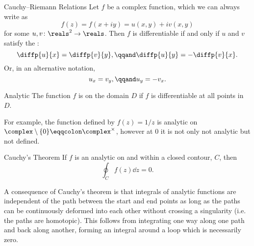 \documentclass[fleqn]{NotesClass}
\begin{document}
    \begin{thm}{Cauchy--Riemann Relations}{}
        Let \(f\) be a complex function, which we can always write as
        \begin{equation}
            f(z) = f(x + iy) = u(x, y) + iv(x, y)
        \end{equation}
        for some \(u, v\colon \reals^2 \to \reals\).
        Then \(f\) is differentiable if and only if \(u\) and \(v\) satisfy the :
        \begin{equation}
            \diffp{u}{x} = \diffp{v}{y}, \qqand \diffp{u}{y} = -\diffp{v}{x}.
        \end{equation}
        Or, in an alternative notation,
        \begin{equation}
            u_x = v_y, \qqand u_y = - v_x.
        \end{equation}
    \end{thm}
    
    \begin{dfn}{Analytic}{}
        The function \(f\) is  on the domain \(D\) if \(f\) is differentiable at all points in \(D\).
    \end{dfn}
    
    For example, the function defined by \(f(z) = 1/z\) is analytic on \(\complex\setminus\{0\} \eqqcolon \complex^{\times}\), however at 0 it is not only not analytic but not defined.
    
    \begin{thm}{Cauchy's Theorem}{}
        If \(f\) is an analytic on and within a closed contour, \(C\), then
        \begin{equation}
            \oint_C f(z) \dd{z} = 0.
        \end{equation}
    \end{thm}
    
    A consequence of Cauchy's theorem is that integrals of analytic functions are independent of the path between the start and end points as long as the paths can be continuously deformed into each other without crossing a singularity (i.e. the paths are homotopic).
    This follows from integrating one way along one path and back along another, forming an integral around a loop which is necessarily zero.
    
\end{document}
